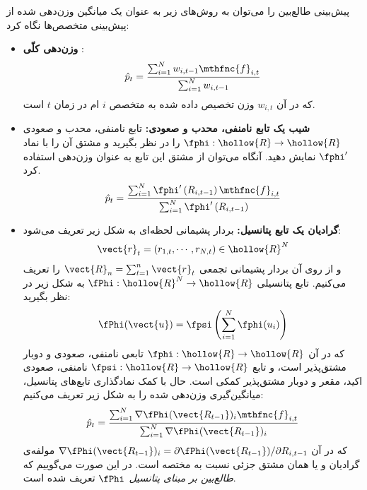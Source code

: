 \documentclass[a4paper,11px]{article}
\begin{document}

پیش‌بینی طالع‌بین را می‌توان به روش‌های زیر به عنوان یک میانگین وزن‌دهی شده
از پیش‌بینی متخصص‌ها نگاه کرد:
\begin{itemize}
\item \textbf{
وزن‌دهی کلّی
}: 
\[
\hat{p}_t = \frac{ \sum^{N}_{i=1} w_{i,t-1} \mthfnc{f}_{i,t} }{ \sum^{N}_{i=1} w_{i,t-1} }
\]
که در آن 
$w_{i,t}$ 
وزن تخصیص داده شده به متخصص 
$i$
ام در زمان 
$t$ 
است.

\item \textbf{
شیب یک تابع نامنفی، محدب و صعودی:
} 
تابع نامنفی، محدب و صعودی 
$\fphi: \hollow{R} \rightarrow \hollow{R}$ 
را در نظر بگیرید و مشتق آن را با نماد 
$\fphi^\prime$ 
نمایش دهید. آنگاه می‌توان از مشتق این تابع به عنوان وزن‌دهی استفاده کرد.
\[
\hat{p}_t = \frac{ \sum^{N}_{i=1} \fphi^\prime \left( R_{i,t-1} \right) \mthfnc{f}_{i,t} }{ \sum^{N}_{i=1} \fphi^\prime \left( R_{i,t-1} \right) }
\]

\item \textbf{
گرادیان یک تابع پتانسیل:
} 
بردار پشیمانی لحظه‌ای به شکل زیر تعریف می‌شود:
\[
\vect{r}_t = ( r_{1,t}, \cdots, r_{N,t} ) \in \hollow{R}^N
\]
و از روی آن بردار پشیمانی تجمعی 
$\vect{R}_n = \sum^{n}_{t=1} \vect{r}_t$ 
را تعریف می‌کنیم. تابع پتانسیلی 
$\fPhi : \hollow{R}^N \rightarrow \hollow{R}$ 
به شکل زیر در نظر بگیرید:
\[
\fPhi (\vect{u}) = \fpsi \left( \sum^{N}_{i=1} \fphi(u_i) \right)
\]
که در آن 
$\fphi : \hollow{R} \rightarrow \hollow{R}$ 
تابعی نامنفی، صعودی و دوبار مشتق‌پذیر است، و تابع 
$\fpsi : \hollow{R} \rightarrow \hollow{R}$ 
نامنفی، صعودی اکید، مقعر و دوبار مشتق‌پذیر کمکی
است. حال با کمک نمادگذاری تابع‌های پتانسیل، میانگین‌گیری وزن‌دهی شده را به شکل زیر تعریف می‌کنیم:
\[
\hat{p}_t = \frac{ \sum^{N}_{i=1} \nabla \fPhi( \vect{R_{t-1}} )_i \mthfnc{f}_{i,t} }{ \sum^{N}_{i=1} \nabla \fPhi (\vect{R_{t-1}})_i }
\]
که در آن 
$\nabla \fPhi( \vect{R_{t-1}} )_i = \partial \fPhi( \vect{R_{t-1}} ) / \partial R_{i,t-1}$ 
مولفه‌ی گرادیان و یا همان مشتق جزئی نسبت به مختصه است. در این صورت می‌گوییم که 
\textit{
طالع‌بین بر مبنای پتانسیل 
$\fPhi$
} 
تعریف شده است.
\end{itemize}
\end{document}
